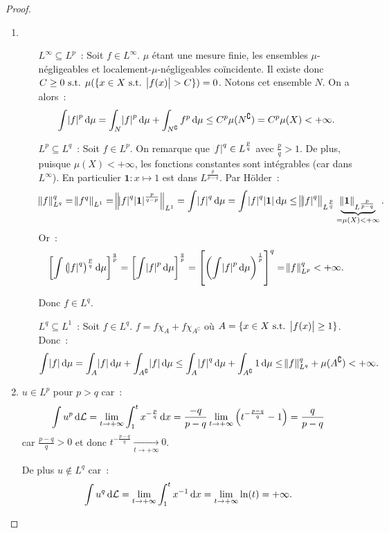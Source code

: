 \documentclass{article}
\newcommand{\pinfty}{{+\infty}}
\newcommand{\st}{\text{ s.t. }}
\newcommand{\C}{\complement}
\begin{document}
\begin{proof}~
\begin{enumerate}
	\item~
	\begin{itemize}
		\item[$L^\infty \subseteq L^p$~:] Soit $f \in L^\infty$. $\mu$ étant une mesure finie, les ensembles $\mu$-négligeables et localement-$\mu$-négligeables coïncidente.
		Il existe donc $C \geq 0 \st \mu(\{x \in X \st \abs {f(x)} > C\}) = 0$. Notons cet ensemble $N$. On a alors~:
		\[\int \abs f^p\dif\mu = \int_N\abs f^p\dif\mu + \int_{N^\C}f^p\dif\mu \leq C^p\mu(N^\C) = C^p\mu(X) < \pinfty.\]

		\item[$L^p \subseteq L^q$~:] Soit $f \in L^p$. On remarque que $\abs f^q \in L^{\frac pq}$ avec $\frac pq > 1$. De plus, puisque $\mu(X) < \pinfty$, les fonctions constantes
		sont intégrables  (car dans $L^\infty$). En particulier $\mathbf 1 : x \mapsto 1$ est dans $L^{\frac p{p-q}}$. Par Hölder~:
		\[\norm f_{L^q}^q = \norm {f^q}_{L^1} = \norm {\abs f^q\abs {\mathbf 1}^{\frac p{q-p}}}_{L^1} = \int\abs f^q\dif\mu = \int\abs f^q\abs {\mathbf 1}\dif\mu
			\leq \norm {\abs f^q}_{L^{\frac pq}}\underbrace {\norm {\mathbf 1}_{L^{\frac p{p-q}}}}_{= \mu(X) < \pinfty}.\]
		Or~:
		\[\left[\int \left(\abs f^q\right)^{\frac pq}\dif\mu\right]^{\frac qp} = \left[\int \abs f^p\dif\mu\right]^{\frac qp} = \left[\left(\int \abs f^p\dif\mu\right)^{\frac 1p}\right]^q
		= \norm f_{L^p}^q < \pinfty.\]

		Donc $f \in L^q$.

		\item[$L^q \subseteq L^1$~:] Soit $f \in L^q$. $f = f\chi_A + f\chi_{A^\C}$ où $A = \{x \in X \st \abs {f(x)} \geq 1\}$. Donc~:
		\[\int \abs f\dif\mu = \int_A\abs f\dif\mu + \int_{A^\C}\abs f\dif\mu \leq \int_A\abs f^q\dif\mu + \int_{A^\C}1\dif\mu \leq \norm f_{L^q}^q + \mu(A^\C) < \pinfty.\]
	\end{itemize}

	\item $u \in L^p$ pour $p > q$ car~:
	\[\int u^p\dif\mathcal L = \lim_{t \to \pinfty}\int_1^tx^{-\frac pq}\dif x = \frac {-q}{p-q}\lim_{t \to \pinfty}\left(t^{-\frac {p-q}q} - 1\right) = \frac q{p-q}\]
	car $\frac {p-q}q > 0$ et donc $t^{-\frac {p-q}q} \xrightarrow[t \to \pinfty]{} 0$.

	De plus $u \not \in L^q$ car~:
	\[\int u^q\dif\mathcal L = \lim_{t \to \pinfty}\int_1^tx^{-1}\dif x = \lim_{t \to \pinfty}\ln(t) = \pinfty.\]


\end{enumerate}
\end{proof}
\end{document}
